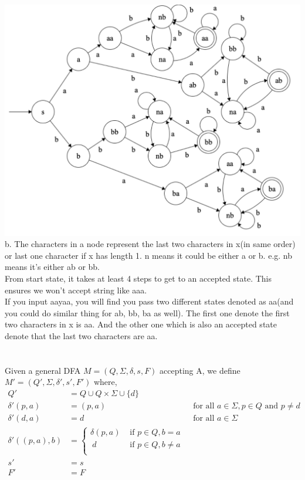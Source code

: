 \documentclass[12pt]{article}
\begin{document}
\includegraphics[width=\textwidth]{q3}
b. The characters in a node represent the last two characters in x(in same order) or last one character if x has length 1.  n means it could be either a or b. e.g. nb means it's either ab or bb.\\

From start state, it takes at least 4 steps to get to an accepted state. This ensures we won't accept string like aaa.\\

If you input aayaa, you will find you pass two different states denoted as aa(and you could do similar thing for ab, bb, ba as well). The first one denote the first two characters in x is aa. And the other one which is also an accepted state denote that the last two characters are aa.

\pagebreak


\section{}

Given a general DFA $M = (Q,\Sigma,\delta,s,F) $ accepting A, we define $M' =  (Q',\Sigma,\delta',s',F') $ where,
\begin{align*}
   Q' &= Q \cup Q \times \Sigma \cup \{d\}\\
   \delta'(p, a) &= (p, a) & \textrm{ for all $a \in \Sigma, p \in Q $ and $p\ne d$}\\
   \delta'(d, a) &= d & \textrm{ for all $a \in \Sigma$} \\
   \delta'((p, a), b) &= \begin{cases}
   \delta(p, a) &  \textrm{ if $p \in Q, b = a$}\\
   \ d  &\textrm{ if $p \in Q, b \ne a$}\\
   \end{cases}\\
   s' &= s&\\
   F' &= F
\end{align*}
\end{document}
